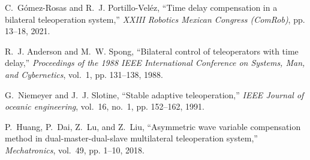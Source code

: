 \begin{thebibliography}{00}
     C.~G{\'o}mez-Rosas and R.~J. Portillo-Vel{\'e}z, ``Time delay compensation in a bilateral teleoperation system,''  \emph{XXIII Robotics Mexican Congress (ComRob)}, pp. 13--18, 2021.

     R.~J. Anderson and M.~W. Spong, ``Bilateral control of teleoperators with time delay,''  \emph{Proceedings of the 1988 IEEE International Conference on Systems, Man, and Cybernetics}, vol.~1, pp. 131--138, 1988.

     G.~Niemeyer and J.~J. Slotine, ``Stable adaptive teleoperation,'' \emph{IEEE Journal of oceanic engineering}, vol.~16, no.~1, pp. 152--162, 1991.

     P.~Huang, P.~Dai, Z.~Lu, and Z.~Liu, ``Asymmetric wave variable compensation method in dual-master-dual-slave multilateral teleoperation system,'' \emph{Mechatronics}, vol.~49, pp. 1--10, 2018.
\end{thebibliography}



